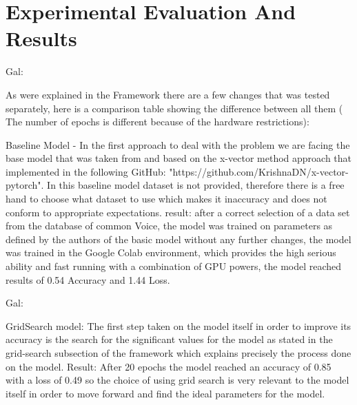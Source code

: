 \documentclass[a4paper]{article}
\begin{document}
\section{Experimental Evaluation And Results}

Gal:

As were explained in the Framework there are a few changes that was tested separately, here is a comparison table showing the difference between all them ( The number of epochs is different because of the hardware restrictions):


\begin{table}[ht]
\centering
\caption{Results Comparison}
\label{tab:Results Comparison}
\end{table}

Baseline Model - In the first approach to deal with the problem we are facing the base model that was taken from \cite{david2018spoken} and based on the x-vector method approach that implemented in the following GitHub:  "https://github.com/KrishnaDN/x-vector-pytorch". In this baseline model dataset is not provided, therefore there is a free hand to choose what dataset to use which makes it inaccuracy and does not conform to appropriate expectations. 
result: after a correct selection of a data set from the database of common Voice, the model was trained on parameters as defined by the authors of the basic model without any further changes, the model was trained in the Google Colab environment, which provides the high serious ability and fast running with a combination of GPU powers, the model reached results of 0.54 Accuracy and 1.44 Loss.

Gal:

GridSearch model: The first step taken on the model itself in order to improve its accuracy is the search for the significant values for the model as stated in the grid-search subsection of the framework which explains precisely the process done on the model.
Result: After 20 epochs the model reached an accuracy of 0.85 with a loss of 0.49 so the choice of using grid search is very relevant to the model itself in order to move forward and find the ideal parameters for the model.
\end{document}
